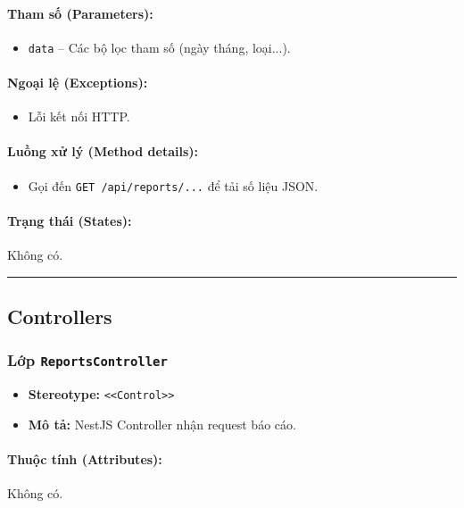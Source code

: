 \documentclass[12pt,a4paper]{article}
\begin{document}
\paragraph{Tham số (Parameters):}
\begin{itemize}[leftmargin=*]
    \item \texttt{data} – Các bộ lọc tham số (ngày tháng, loại...).
\end{itemize}


\paragraph{Ngoại lệ (Exceptions):}
\begin{itemize}[leftmargin=*]
    \item Lỗi kết nối HTTP.
\end{itemize}


\paragraph{Luồng xử lý (Method details):}
\begin{itemize}[leftmargin=*]
    \item Gọi đến \texttt{GET /api/reports/...} để tải số liệu JSON.
\end{itemize}


\paragraph{Trạng thái (States):}
Không có.

\vskip 0.5cm
\noindent\rule{\textwidth}{0.5pt}
\vskip 0.5cm

\subsection{Controllers}

\subsubsection{Lớp \texttt{ReportsController}}
\begin{itemize}[leftmargin=*]
    \item \textbf{Stereotype:} \texttt{\textless{}\textless{}Control\textgreater{}\textgreater{}}
    \item \textbf{Mô tả:} NestJS Controller nhận request báo cáo.
\end{itemize}

\paragraph{Thuộc tính (Attributes):}
Không có.
\end{document}
